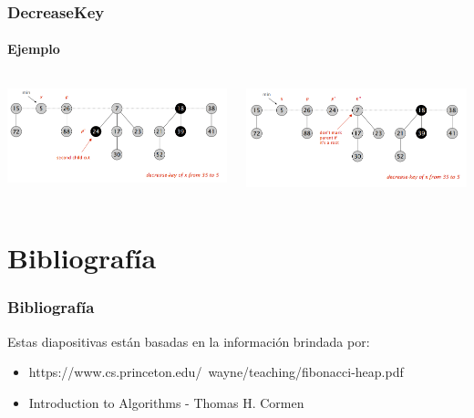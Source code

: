 \documentclass{beamer}
\begin{document}
\begin{frame}
  \frametitle{DecreaseKey}
  \framesubtitle{Ejemplo}
   
     \begin{columns}[t]
    \centering
    \includegraphics[width =1 \textwidth]{img/decrease/09.png} 
      
    \centering
    \includegraphics[width =1 \textwidth]{img/decrease/10.png} 

   \end{columns}
   
\end{frame}

\section{Bibliografía}
\begin{frame}
\frametitle{Bibliografía}
 Estas diapositivas están basadas en la información brindada por:
\begin{itemize}
 \item https://www.cs.princeton.edu/~wayne/teaching/fibonacci-heap.pdf
 \item Introduction to Algorithms - Thomas H. Cormen
\end{itemize}


\end{frame}
\end{document}
